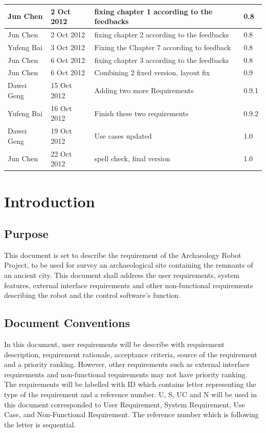 \documentclass[11pt, a4paper]{report}
\begin{document}
\begin{tabular}{| l | l | l | l | }
Jun Chen	                &	2 Oct 2012		    &	fixing chapter 1 according to the feedbacks			&	0.8				\\ \hline
Jun Chen	                &	2 Oct 2012		    &	fixing chapter 2 according to the feedbacks			&	0.8 			\\ \hline
Yufeng Bai	                &	3 Oct 2012	    &	Fixing the Chapter 7 according to feedback	       	&	0.8				\\ \hline
Jun Chen	                &	6 Oct 2012	        &	fixing chapter 3 according to the feedbacks			&	0.8 			\\ \hline
Jun Chen	                &	6 Oct 2012	        &	Combining 2 fixed version, layout fix			    &	0.9 			\\ \hline
Dawei Geng                  & 15 Oct 2012           & Adding two more Requirements                          &   0.9.1       	\\ \hline
Yufeng Bai					&	16 Oct 2012			& Finish these two requirements							&	0.9.2			\\ \hline
Dawei Geng					&	19 Oct 2012			& Use cases updated										&	1.0			\\ \hline
Jun Chen					&	22 Oct 2012			& spell check, final version							&	1.0			\\ \hline


\end{tabular}
\clearpage


\chapter{Introduction}

\section{Purpose}
This document is set to describe the requirement of the Archaeology Robot Project, to be used for survey an archaeological site containing the remnants of an ancient city. This document shall address the user requirements, system features, external interface requirements and other non-functional requirements describing the robot and the control software's function. 


\section{Document Conventions}
In this document, user requirements will be describe with requirement description, requirement rationale, acceptance criteria, source of the requirement and a priority ranking. However, other requirements such as external interface requirements and non-functional requirements may not have priority ranking. 
The requirements will be labelled with ID which contains letter representing the type of the requirement and a reference number. U, S, UC and N will be used in this document corresponded to User Requirement, System Requirement, Use Case, and Non-Functional Requirement.  The reference number which is following the letter is sequential.
\end{document}
